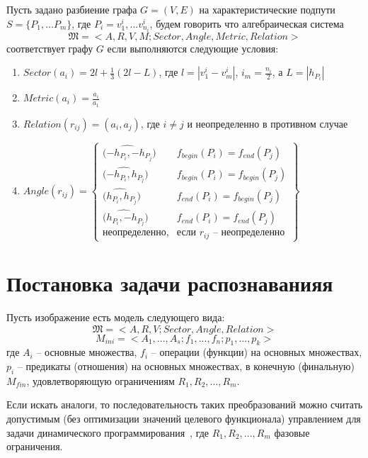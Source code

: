 \begin{definition}
Пусть задано разбиение графа $G=(V,E)$ на характеристические подпути $S=\{P_1, \dots P_m\}$, где $P_i=v^i_1, \dots v^i_{n_i}$, будем говорить что алгебраическая система
$$\mathfrak{M} = < A, R, V, M; Sector, Angle, Metric, Relation >$$
соответствует графу $G$ если выполняются следующие условия:
\begin{enumerate}
\item $Sector(a_i) = 2l + \frac{1}{3}(2l - L)$, где $l=|v^i_1-v^i_m|$, $i_m = \frac{n_i}{2}$,  а $L=|h_{P_i}|$
\item $Metric(a_i) = \frac{a_i}{a_1}$
\item $Relation(r_{ij}) = (a_i, a_j)$, где $i\neq j$ и неопределенно в противном случае
\item $Angle(r_{ij})=
	\left\{		
	\begin{array}{ll}
	\hat{(-h_{P_i}, -h_{P_j}}) & f_{begin}(P_i) = f_{end}(P_j) \\
	\hat{(-h_{P_i}, h_{P_j}}) & f_{begin}(P_i) = f_{begin}(P_j) \\
	\hat{(h_{P_i}, h_{P_j}}) & f_{end}(P_i) = f_{begin}(P_j) \\
	\hat{(h_{P_i}, -h_{P_j}}) & f_{end}(P_i) = f_{end}(P_j) \\	
	\text{неопределенно}, & \text{если } r_{ij} \text{ -- неопределенно}
	\end{array}
	\right\}	$	
\end{enumerate}
\end{definition}

\section{Постановка задачи распознаванияя }
Пусть изображение есть модель следующего вида:
\begin{equation}
\mathfrak{M} = < A, R, V; Sector, Angle, Relation >
\label{vipeq1}
\end{equation}
\begin{equation}
M_{ini} = <A_1,...,A_s;f_1,...,f_n;p_1,...,p_k>
\label{vipeq2}
\end{equation}
где $A_i$ -- основные множества, $f_i$ -- операции (функции) на основных множествах, $p_i$ -- предикаты (отношения) на основных множествах, в конечную (финальную) $M_{fin}$, удовлетворяющую ограничениям $R_1,R_2,...,R_m$.

Если искать аналоги, то последовательность таких преобразований можно считать допустимым (без оптимизации значений целевого функционала) управлением для задачи динамического программирования~\cite{D1}, где $R_1,R_2,...,R_m$ фазовые ограничения.

